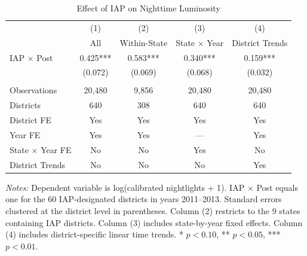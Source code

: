 \begin{table}[H]
\centering
\caption{Effect of IAP on Nighttime Luminosity}
\label{tab:main}
\begin{threeparttable}
\begin{tabular}{lcccc}
\toprule
 & (1) & (2) & (3) & (4) \\
 & All & Within-State & State $\times$ Year & District Trends \\
\midrule
IAP $\times$ Post & 0.425*** & 0.583*** & 0.340*** & 0.159*** \\
 & (0.072) & (0.069) & (0.068) & (0.032) \\
 & & & & \\
Observations & 20,480 & 9,856 & 20,480 & 20,480 \\
Districts & 640 & 308 & 640 & 640 \\
District FE & Yes & Yes & Yes & Yes \\
Year FE & Yes & Yes & --- & Yes \\
State $\times$ Year FE & No & No & Yes & No \\
District Trends & No & No & No & Yes \\
\bottomrule
\end{tabular}
\begin{tablenotes}[flushleft]
\small
\item \textit{Notes:} Dependent variable is log(calibrated nightlights + 1). IAP $\times$ Post equals one for the 60 IAP-designated districts in years 2011--2013. Standard errors clustered at the district level in parentheses. Column (2) restricts to the 9 states containing IAP districts. Column (3) includes state-by-year fixed effects. Column (4) includes district-specific linear time trends. * $p<0.10$, ** $p<0.05$, *** $p<0.01$.
\end{tablenotes}
\end{threeparttable}
\end{table}

